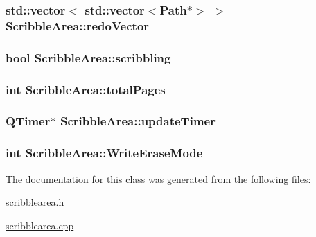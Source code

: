 \label{classScribbleArea_a60a162ac373cf5584f37c64d1189fbd4}
\hypertarget{classScribbleArea_afe1dee6ab3f71d667010f85e38453ce7}{
\subsubsection[{redoVector}]{\setlength{\rightskip}{0pt plus 5cm}std::vector$<$ std::vector$<${\bf Path}$\ast$$>$ $>$ {\bf ScribbleArea::redoVector}}}
\label{classScribbleArea_afe1dee6ab3f71d667010f85e38453ce7}
\hypertarget{classScribbleArea_a457d8a9f83168cca50ed05675a086be3}{
\subsubsection[{scribbling}]{\setlength{\rightskip}{0pt plus 5cm}bool {\bf ScribbleArea::scribbling}}}
\label{classScribbleArea_a457d8a9f83168cca50ed05675a086be3}
\hypertarget{classScribbleArea_aa4969a32252451bd4f51c4a56d07b719}{
\subsubsection[{totalPages}]{\setlength{\rightskip}{0pt plus 5cm}int {\bf ScribbleArea::totalPages}}}
\label{classScribbleArea_aa4969a32252451bd4f51c4a56d07b719}
\hypertarget{classScribbleArea_acc356bd79ca5a2ffbd1cf0aebac58ec0}{
\subsubsection[{updateTimer}]{\setlength{\rightskip}{0pt plus 5cm}QTimer$\ast$ {\bf ScribbleArea::updateTimer}}}
\label{classScribbleArea_acc356bd79ca5a2ffbd1cf0aebac58ec0}
\hypertarget{classScribbleArea_acca7f35976c146f050a05c6d31ee69f8}{
\subsubsection[{WriteEraseMode}]{\setlength{\rightskip}{0pt plus 5cm}int {\bf ScribbleArea::WriteEraseMode}}}
\label{classScribbleArea_acca7f35976c146f050a05c6d31ee69f8}


The documentation for this class was generated from the following files:\begin{DoxyCompactItemize}
\item 
\hyperlink{scribblearea_8h}{scribblearea.h}\item 
\hyperlink{scribblearea_8cpp}{scribblearea.cpp}\end{DoxyCompactItemize}
